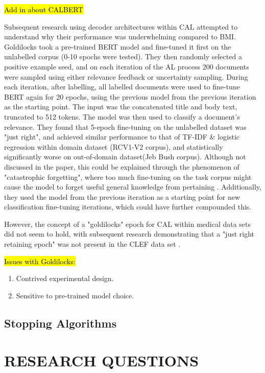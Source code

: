 \documentclass[10pt, english]{article}
\begin{document}
\hl{Add in about CALBERT}


Subsequent research using decoder architectures within CAL attempted to understand why their performance was underwhelming compared to BMI. 
Goldilocks \cite{yang_goldilocks_2022} took a pre-trained BERT model and fine-tuned it first on the unlabelled corpus (0-10 epochs were tested). They then randomly selected a positive example seed, and on each iteration of the AL process 200 documents were sampled using either relevance feedback or uncertainty sampling. During each iteration, after labelling, all labelled documents were used to fine-tune BERT again for 20 epochs, using the previous model from the previous iteration as the starting point. The input was the concatenated title and body text, truncated to 512 tokens. The model was then used to classify a document's relevance. They found that 5-epoch fine-tuning on the unlabelled dataset was "just right", and achieved similar performance to that of TF-IDF \& logistic regression within domain dataset (RCV1-V2 corpus), and statistically significantly worse on out-of-domain dataset(Jeb Bush corpus). Although not discussed in the paper, this could be explained through the phenomenon of "catastrophic forgetting", where too much fine-tuning on the task corpus might cause the model to forget useful general knowledge from pertaining \cite{xu_forget_2020}. Additionally, they used the model from the previous iteration as a starting point for new classification fine-tuning iterations, which could have further compounded this. 

However, the concept of a "goldilocks" epoch for CAL within medical data sets did not seem to hold, with subsequent research demonstrating that a "just right retaining epoch" was not present in the CLEF data set \cite{noauthor_ielabgoldilocks-reproduce_2024}. 

\hl{Issues with Goldilocks:}
\begin{enumerate}
    \item Contrived experimental design.
    \item Sensitive to pre-trained model choice.
\end{enumerate}

\subsection{Stopping Algorithms}

\section{RESEARCH QUESTIONS}
\end{document}
